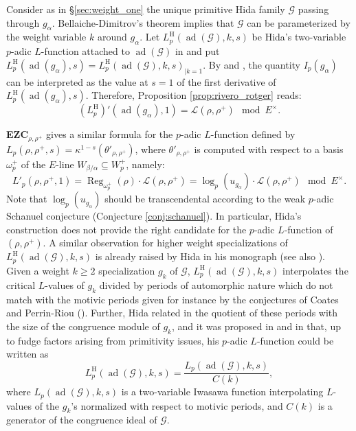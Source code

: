 \documentclass[12pt]{amsart}
\newcommand\cG{\mathcal{G}}
\newcommand\cL{\mathcal{L}}
\DeclareMathOperator{\ad}{ad}
\DeclareMathOperator{\Reg}{Reg}
\newcommand{\HH}{\mathrm{H}}
\theoremstyle{defstyle}
\theoremstyle{thmstyle}
\begin{document}
Consider as in \S\ref{sec:weight_one} the unique primitive Hida family  $\cG$ passing through $g_\alpha$. Bellaiche-Dimitrov's theorem \cite{bellaiche2016eigencurve} implies that $\cG$ can be parameterized by the weight variable $k$ around $g_\alpha$. Let $L^\HH_p(\ad(\cG),k,s)$ be Hida's two-variable $p$-adic $L$-function attached to $\ad(\cG)$ in \cite{hidaGL3} and put $L^\HH_p(\ad(g_\alpha),s)=L^\HH_p(\ad(\cG),k,s)_{\big|k=1}$. 
By \cite[Lem. 4.2]{DLR2} and \cite[Prop. 2.5]{riveroadjoint}, the quantity $I_p(g_\alpha)$ can be interpreted as the value at $s=1$ of the first derivative of $L^\HH_p(\ad(g_\alpha),s)$. Therefore, Proposition \ref{prop:rivero_rotger} reads:
\begin{equation}\label{eq:derivative_hida}
	(L^\HH_p)'(\ad(g_\alpha),1)= \cL(\rho,\rho^+)\mod E^\times.
\end{equation}

\textbf{EZC}$_{\rho,\rho^+}$ gives a similar formula for the $p$-adic $L$-function defined by $L_p(\rho,\rho^+,s)=\kappa^{1-s}(\theta'_{\rho,\rho^+})$, where $\theta'_{\rho,\rho^+}$ is computed with respect to a basis $\omega_p^+$ of the $E$-line $W_{\beta/\alpha}\subseteq W_p^+$, namely:
\begin{equation}\label{eq:derivative_motivic}
	L'_p(\rho,\rho^+,1)= \Reg_{{\omega}^+_{p}}(\rho)\cdot\cL(\rho,\rho^+)=\log_p (u_{g_\alpha})\cdot\cL(\rho,\rho^+) \mod E^\times.
\end{equation}
Note that $\log_p (u_{g_\alpha})$ should be transcendental according to the weak $p$-adic Schanuel conjecture (Conjecture \ref{conj:schanuel}). In particular, Hida's construction does not provide the right candidate for the $p$-adic $L$-function of $(\rho,\rho^+)$. A similar observation for higher weight specializations of $L^\HH_p(\ad(\cG),k,s)$ is already raised by Hida in his monograph \cite{hidagenuine} (see also \cite[\S4]{hidatilouineurban}). Given a weight $k\geq 2$ specialization $g_k$ of $\cG$, $L^\HH_p(\ad(\cG),k,s)$ interpolates the critical $L$-values of $g_k$ divided by periods of automorphic nature which do not match with the motivic periods given for instance by the conjectures of Coates and Perrin-Riou (\cite{coatesperrinriou}). Further, Hida related in \cite{hidamodules} the quotient of these periods with the size of the congruence module of $g_k$, and it was proposed in \cite{hidagenuine} and in \cite[\S4]{hidatilouineurban} that, up to fudge factors arising from primitivity issues, his $p$-adic $L$-function could be written as
\begin{equation}\label{eq:conj_Hida}
	L^\HH_p(\ad(\cG),k,s)=\frac{L_p(\ad(\cG),k,s)}{C(k)},
\end{equation}
where $L_p(\ad(\cG),k,s)$ is a two-variable Iwasawa function interpolating $L$-values of the $g_k$'s normalized with respect to motivic periods, and $C(k)$ is a generator of the congruence ideal of $\cG$. 
\end{document}
